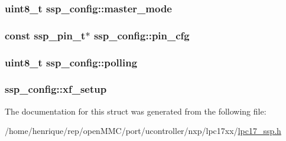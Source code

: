 \hypertarget{structssp__config_a16c90aad6065d69e14a5c9174a854d88}{
\subsubsection[{master\-\_\-mode}]{\setlength{\rightskip}{0pt plus 5cm}uint8\-\_\-t ssp\-\_\-config\-::master\-\_\-mode}}\label{structssp__config_a16c90aad6065d69e14a5c9174a854d88}
\hypertarget{structssp__config_aa07c7d7a03b214bbc6c083243d2c055e}{
\subsubsection[{pin\-\_\-cfg}]{\setlength{\rightskip}{0pt plus 5cm}const {\bf ssp\-\_\-pin\-\_\-t}$\ast$ ssp\-\_\-config\-::pin\-\_\-cfg}}\label{structssp__config_aa07c7d7a03b214bbc6c083243d2c055e}
\hypertarget{structssp__config_a1e8c08df640404fc33f71c4d285e9e45}{
\subsubsection[{polling}]{\setlength{\rightskip}{0pt plus 5cm}uint8\-\_\-t ssp\-\_\-config\-::polling}}\label{structssp__config_a1e8c08df640404fc33f71c4d285e9e45}
\hypertarget{structssp__config_ab4497ade90accc6a7ceed4bd2bbaf3cc}{
\subsubsection[{xf\-\_\-setup}]{ ssp\-\_\-config\-::xf\-\_\-setup}}\label{structssp__config_ab4497ade90accc6a7ceed4bd2bbaf3cc}


The documentation for this struct was generated from the following file\-:\begin{DoxyCompactItemize}
\item 
/home/henrique/rep/open\-M\-M\-C/port/ucontroller/nxp/lpc17xx/\hyperlink{lpc17__ssp_8h}{lpc17\-\_\-ssp.\-h}\end{DoxyCompactItemize}
